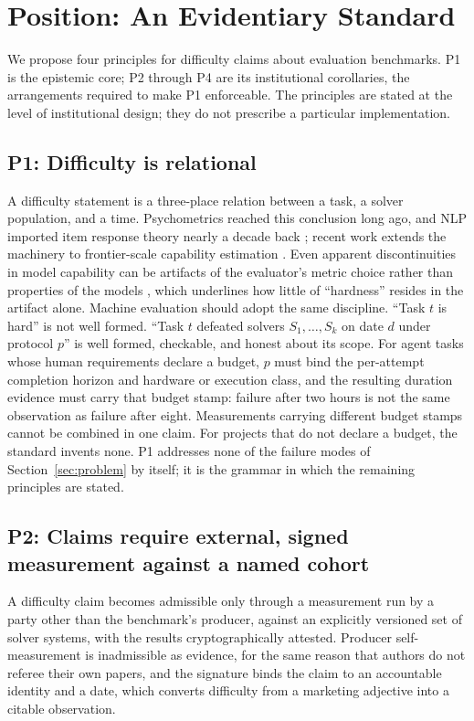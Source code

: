 \documentclass[11pt]{article}
\begin{document}
\section{Position: An Evidentiary Standard}
\label{sec:position}

We propose four principles for difficulty claims about evaluation benchmarks. P1 is the epistemic core; P2 through P4 are its institutional corollaries, the arrangements required to make P1 enforceable. The principles are stated at the level of institutional design; they do not prescribe a particular implementation.

\subsection{P1: Difficulty is relational}

A difficulty statement is a three-place relation between a task, a solver population, and a time. Psychometrics reached this conclusion long ago, and NLP imported item response theory nearly a decade back \citep{lalor2016irt}; recent work extends the machinery to frontier-scale capability estimation \citep{truong2026irt, bogdan2026psychometrics}. Even apparent discontinuities in model capability can be artifacts of the evaluator's metric choice rather than properties of the models \citep{schaeffer2023mirage}, which underlines how little of ``hardness'' resides in the artifact alone. Machine evaluation should adopt the same discipline. ``Task $t$ is hard'' is not well formed. ``Task $t$ defeated solvers $S_1, \ldots, S_k$ on date $d$ under protocol $p$'' is well formed, checkable, and honest about its scope. For agent tasks whose human requirements declare a budget, $p$ must bind the per-attempt completion horizon and hardware or execution class, and the resulting duration evidence must carry that budget stamp: failure after two hours is not the same observation as failure after eight. Measurements carrying different budget stamps cannot be combined in one claim. For projects that do not declare a budget, the standard invents none. P1 addresses none of the failure modes of Section~\ref{sec:problem} by itself; it is the grammar in which the remaining principles are stated.

\subsection{P2: Claims require external, signed measurement against a named cohort}

A difficulty claim becomes admissible only through a measurement run by a party other than the benchmark's producer, against an explicitly versioned set of solver systems, with the results cryptographically attested. Producer self-measurement is inadmissible as evidence, for the same reason that authors do not referee their own papers, and the signature binds the claim to an accountable identity and a date, which converts difficulty from a marketing adjective into a citable observation.
\end{document}
